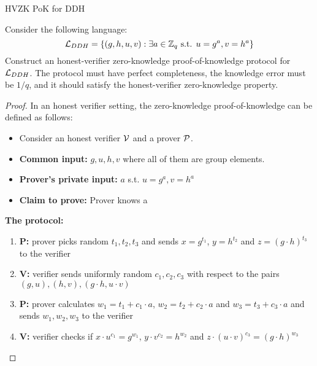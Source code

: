 \begin{solution}{HVZK PoK for DDH}\label{ques:2.2}
    \begin{question}
    Consider the following language:
    \begin{equation}
        \mathcal{L}_{DDH} = \{(g,h,u,v): \exists a \in \mathbb{Z}_q \text{ s.t. }u = g^a , v = h^a \}
    \end{equation}
    Construct an honest-verifier zero-knowledge proof-of-knowledge protocol for $\mathcal{L}_{DDH}$. The protocol must have perfect completeness, the knowledge error must be $1/q$, and it should satisfy the honest-verifier zero-knowledge property.
    \end{question}
    \tcblower{}
    \begin{proof}
    In an honest verifier setting, the zero-knowledge proof-of-knowledge can be defined as follows: 
    \begin{itemize}
        \item Consider an honest verifier $\mathcal{V}$ and a prover $\mathcal{P}$.
        \item \textbf{Common input:} $g, u, h, v$ where all of them are group elements.
        \item \textbf{Prover's private input:} $a$ s.t. $u = g^a , v = h^a$
        \item \textbf{Claim to prove:} Prover knows a
    \end{itemize}

    \textbf{The protocol:}
    \begin{enumerate}
        \item \textbf{P:} prover picks random $t_1, t_2, t_3$ and sends $x = g^{t_1}$, $y = h^{t_2}$ and $z = (g \cdot h)^{t_3}$ to the verifier
        \item \textbf{V:} verifier sends uniformly random $c_1, c_2, c_3$ with respect to the pairs $(g,u),(h,v),(g \cdot h,u \cdot v)$
        \item \textbf{P:} prover calculates $w_1 = t_1 +c_1\cdot a$, $w_2 = t_2 +c_2\cdot a$ and $w_3 = t_3 +c_3\cdot a$ and sends $w_1, w_2, w_3$ to the verifier
        \item \textbf{V:} verifier checks if $x \cdot u^{c_1} = g^{w_1}$, $y \cdot v^{c_2} = h^{w_2}$ and $z \cdot (u \cdot v)^{c_3} = (g \cdot h)^{w_3}$
    \end{enumerate}


\end{proof}
\end{solution}
